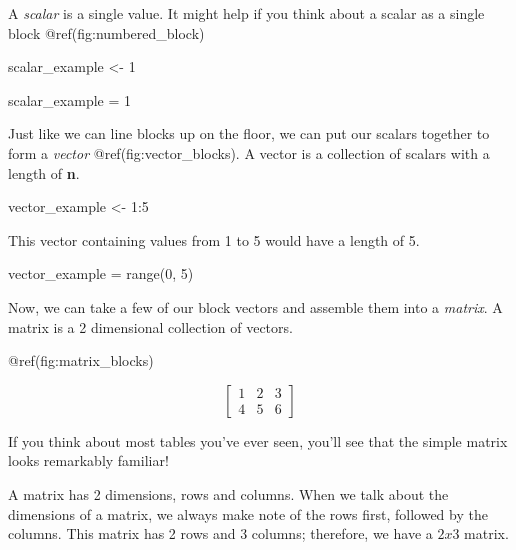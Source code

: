 \documentclass[
  letterpaper,
]{krantz}
\newenvironment{Shaded}{}{}
\newcommand{\BuiltInTok}[1]{\textcolor[rgb]{0.00,0.50,0.00}{#1}}
\newcommand{\DecValTok}[1]{\textcolor[rgb]{0.25,0.63,0.44}{#1}}
\newcommand{\NormalTok}[1]{#1}
\newcommand{\OperatorTok}[1]{\textcolor[rgb]{0.40,0.40,0.40}{#1}}
\newcommand{\OtherTok}[1]{\textcolor[rgb]{0.00,0.44,0.13}{#1}}
\newcommand{\SpecialCharTok}[1]{\textcolor[rgb]{0.25,0.44,0.63}{#1}}
\begin{document}
A \emph{scalar} is a single value. It might help if you think about a
scalar as a single block @ref(fig:numbered\_block)

\begin{Shaded}
\begin{Highlighting}[]
\NormalTok{scalar\_example }\OtherTok{\textless{}{-}} \DecValTok{1}
\end{Highlighting}
\end{Shaded}

\begin{Shaded}
\begin{Highlighting}[]
\NormalTok{scalar\_example }\OperatorTok{=} \DecValTok{1}
\end{Highlighting}
\end{Shaded}

Just like we can line blocks up on the floor, we can put our scalars
together to form a \emph{vector} @ref(fig:vector\_blocks). A vector is a
collection of scalars with a length of \textbf{n}.

\begin{Shaded}
\begin{Highlighting}[]
\NormalTok{vector\_example }\OtherTok{\textless{}{-}} \DecValTok{1}\SpecialCharTok{:}\DecValTok{5}
\end{Highlighting}
\end{Shaded}

This vector containing values from 1 to 5 would have a length of 5.

\begin{Shaded}
\begin{Highlighting}[]
\NormalTok{vector\_example }\OperatorTok{=} \BuiltInTok{range}\NormalTok{(}\DecValTok{0}\NormalTok{, }\DecValTok{5}\NormalTok{)}
\end{Highlighting}
\end{Shaded}

Now, we can take a few of our block vectors and assemble them into a
\emph{matrix}. A matrix is a 2 dimensional collection of vectors.

@ref(fig:matrix\_blocks)

\[
\begin{bmatrix}
1 & 2 & 3\\
4 & 5 & 6
\end{bmatrix}
\]

If you think about most tables you've ever seen, you'll see that the
simple matrix looks remarkably familiar!

A matrix has 2 dimensions, rows and columns. When we talk about the
dimensions of a matrix, we always make note of the rows first, followed
by the columns. This matrix has 2 rows and 3 columns; therefore, we have
a \(2x3\) matrix.
\end{document}
